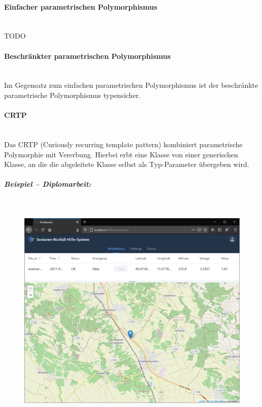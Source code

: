			\paragraph{Einfacher parametrischen Polymorphismus}\mbox{}\\
				TODO
				
			\paragraph{Beschränkter parametrischen Polymorphismus}\mbox{}\\
				Im Gegensatz zum einfachen parametrischen Polymorphismus ist der beschränkte parametrische Polymorphismus
				typensicher.
				
			\paragraph{CRTP}\mbox{}\\
				Das CRTP (Curiously recurring template pattern) kombiniert parametrische Polymorphie mit Vererbung. Hierbei
				erbt eine Klasse von einer generischen Klasse, an die die abgeleitete Klasse selbst als Typ-Parameter übergeben
				wird.
				
				\UseRawInputEncoding{}
				
				\subparagraph{Beispiel -- Diplomarbeit:}\mbox{}\\
				
					\begin{figure}[H]
						\includegraphics[width=\textwidth]{polymorphie/universell/parametrisch/crtp/beispiele/diplomarbeit/applikationsserver.png}
					\end{figure}
					
